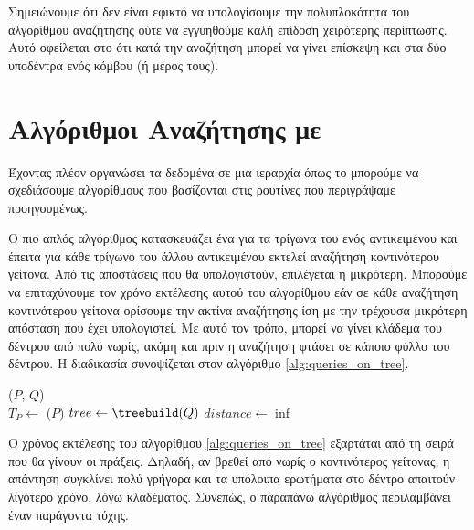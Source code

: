 Σημειώνουμε ότι δεν είναι εφικτό να υπολογίσουμε την πολυπλοκότητα 
του αλγορίθμου αναζήτησης ούτε να εγγυηθούμε καλή επίδοση 
χειρότερης περίπτωσης. 
Αυτό οφείλεται στο ότι κατά την αναζήτηση μπορεί να γίνει 
επίσκεψη και στα δύο υποδέντρα ενός κόμβου (ή μέρος τους).

\section{Αλγόριθμοι Αναζήτησης με }
Έχοντας πλέον οργανώσει τα δεδομένα 
σε μια ιεραρχία όπως το  μπορούμε 
να σχεδιάσουμε αλγορίθμους που βασίζονται στις 
ρουτίνες που περιγράψαμε προηγουμένως.

Ο πιο απλός αλγόριθμος κατασκευάζει ένα 
για τα τρίγωνα του ενός αντικειμένου και έπειτα για 
κάθε τρίγωνο του άλλου αντικειμένου εκτελεί αναζήτηση 
κοντινότερου γείτονα. 
Από τις αποστάσεις που θα υπολογιστούν, επιλέγεται η 
μικρότερη.
Μπορούμε να επιταχύνουμε τον χρόνο εκτέλεσης αυτού 
του αλγορίθμου εάν σε κάθε αναζήτηση κοντινότερου 
γείτονα ορίσουμε την ακτίνα αναζήτησης ίση με 
την τρέχουσα μικρότερη απόσταση που έχει υπολογιστεί.
Με αυτό τον τρόπο, μπορεί να γίνει κλάδεμα του δέντρου 
από πολύ νωρίς, ακόμη και πριν η αναζήτηση φτάσει σε 
κάποιο φύλλο του δέντρου. 
Η διαδικασία συνοψίζεται στον αλγόριθμο 
\ref{alg:queries_on_tree}.

\IncMargin{1.5em}
\begin{algorithm}[h]
    \caption[Απόσταση Τριγωνικών Πλεγμάτων με Ερωτήματα  στο ]{
        }
    \label{alg:queries_on_tree}
    \DontPrintSemicolon
    \Indm\nonl\meshdist($P$, $Q$)\\
    \Indp
        $T_P \gets$ \trias($P$) \;
        $tree \gets \treebuild(Q)$ \;
        $distance \gets \inf$ \;

\end{algorithm}
\DecMargin{1.5em}

Ο χρόνος εκτέλεσης του αλγορίθμου \ref{alg:queries_on_tree}
εξαρτάται από τη σειρά που θα γίνουν οι πράξεις.
Δηλαδή, αν βρεθεί από νωρίς ο κοντινότερος γείτονας, 
η απάντηση συγκλίνει πολύ γρήγορα και 
τα υπόλοιπα ερωτήματα στο δέντρο απαιτούν λιγότερο 
χρόνο, λόγω κλαδέματος.
Συνεπώς, ο παραπάνω αλγόριθμος περιλαμβάνει έναν 
παράγοντα τύχης.

